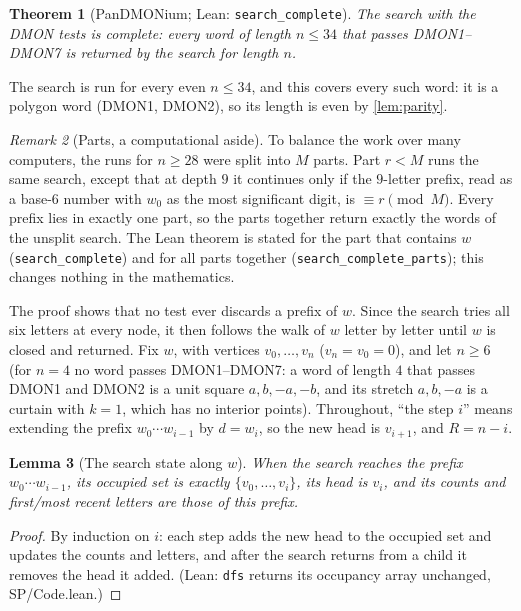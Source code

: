 \documentclass[11pt]{article}
\theoremstyle{plain}
\newtheorem{theorem}{Theorem}[section]
\newtheorem{lemma}[theorem]{Lemma}
\theoremstyle{definition}
\theoremstyle{remark}
\newtheorem{remark}[theorem]{Remark}
\newcommand{\lean}[1]{\texttt{#1}}
\newcommand{\dmon}[1]{\textup{DMON#1}}
\begin{document}
\begin{theorem}[PanDMONium; Lean: \lean{search\_complete}]\label{thm:pandmonium}
The search with the DMON tests is complete: every word of length $n\le34$ that passes \dmon1--\dmon7 is
returned by the search for length $n$.
\end{theorem}
The search is run for every even $n\le34$, and this covers every such word: it is a polygon word
(\dmon1, \dmon2), so its length is even by \cref{lem:parity}.

\begin{remark}[Parts, a computational aside]\label{rem:parts}
To balance the work over many computers, the runs for $n\ge28$ were split into $M$ parts. Part $r<M$
runs the same search, except that at depth $9$ it continues only if the $9$-letter prefix, read as a
base-$6$ number with $w_0$ as the most significant digit, is $\equiv r\pmod M$. Every prefix lies in
exactly one part, so the parts together return exactly the words of the unsplit search. The Lean
theorem is stated for the part that contains $w$ (\lean{search\_complete}) and for all parts together
(\lean{search\_complete\_parts}); this changes nothing in the mathematics.
\end{remark}

The proof shows that no test ever discards a prefix of $w$. Since the search tries all six letters at
every node, it then follows the walk of $w$ letter by letter until $w$ is closed and returned. Fix $w$,
with vertices $v_0,\dots,v_n$ ($v_n=v_0=0$), and let $n\ge6$ (for $n=4$ no word passes \dmon1--\dmon7: a word
of length $4$ that passes \dmon1 and \dmon2 is a unit square $a,b,-a,-b$, and its stretch $a,b,-a$ is a
curtain with $k=1$, which has no interior points). Throughout, ``the step $i$'' means
extending the prefix $w_0\cdots w_{i-1}$ by $d=w_i$, so the new head is $v_{i+1}$, and $R=n-i$.

\begin{lemma}[The search state along $w$]\label{lem:state}
When the search reaches the prefix $w_0\cdots w_{i-1}$, its occupied set is exactly $\{v_0,\dots,v_i\}$,
its head is $v_i$, and its counts and first/most recent letters are those of this prefix.
\end{lemma}
\begin{proof}
By induction on $i$: each step adds the new head to the occupied set and updates the counts and letters,
and after the search returns from a child it removes the head it added. (Lean: \lean{dfs} returns its
occupancy array unchanged, SP/Code.lean.)
\end{proof}
\end{document}
